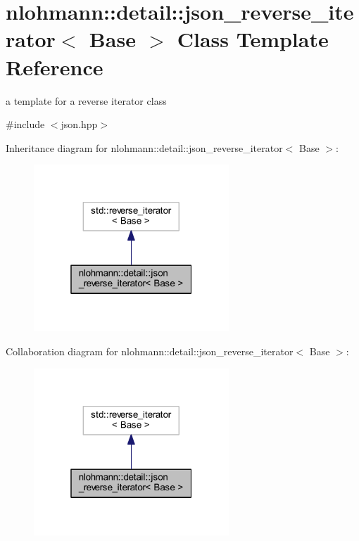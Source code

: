\hypertarget{classnlohmann_1_1detail_1_1json__reverse__iterator}{}\section{nlohmann\+::detail\+::json\+\_\+reverse\+\_\+iterator$<$ Base $>$ Class Template Reference}
\label{classnlohmann_1_1detail_1_1json__reverse__iterator}


a template for a reverse iterator class  




{\ttfamily \#include $<$json.\+hpp$>$}



Inheritance diagram for nlohmann\+::detail\+::json\+\_\+reverse\+\_\+iterator$<$ Base $>$\+:
\nopagebreak
\begin{figure}[H]
\begin{center}
\leavevmode
\includegraphics[width=208pt]{classnlohmann_1_1detail_1_1json__reverse__iterator__inherit__graph}
\end{center}
\end{figure}


Collaboration diagram for nlohmann\+::detail\+::json\+\_\+reverse\+\_\+iterator$<$ Base $>$\+:
\nopagebreak
\begin{figure}[H]
\begin{center}
\leavevmode
\includegraphics[width=208pt]{classnlohmann_1_1detail_1_1json__reverse__iterator__coll__graph}
\end{center}
\end{figure}
